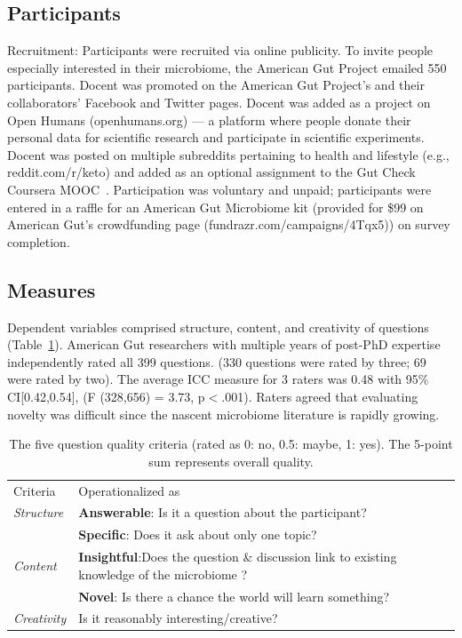 \subsection*{Participants}
Recruitment: Participants were recruited via online publicity. To invite people especially interested in their microbiome, the American Gut Project emailed 550 participants. Docent was promoted on the American Gut Project’s and their collaborators’ Facebook and Twitter pages. Docent was added as a project on Open Humans (openhumans.org) — a platform where people donate their personal data for scientific research and participate in scientific experiments. Docent was posted on multiple subreddits pertaining to health and lifestyle (e.g., reddit.com/r/keto) and added as an optional assignment to the Gut Check Coursera MOOC~\cite{Knight2016}. Participation was voluntary and unpaid; participants were entered in a raffle for an American Gut Microbiome kit (provided for \$99 on American Gut’s crowdfunding page (fundrazr.com/campaigns/4Tqx5)) on survey completion.

\subsection*{Measures}
Dependent variables comprised structure, content, and creativity of questions (Table~\ref{d-tab:rubric1}). American Gut researchers with multiple years of post-PhD expertise independently rated all 399 questions. (330 questions were rated by three; 69 were rated by two). The average ICC measure for 3 raters was 0.48 with 95\% CI[0.42,0.54], (F (328,656) = 3.73, p$<$.001). Raters agreed that evaluating novelty was difficult since the nascent microbiome literature is rapidly growing.

\vspace{0.25in}
\begin{table}[!ht]
\caption[The five question quality criteria]
{The five question quality criteria (rated as 0: no, 0.5:
maybe, 1: yes). The 5-point sum represents overall quality.}

\vspace{-0.25in}
\begin{center}
\renewcommand{\arraystretch}{1.5} %
\begin{tabular}{p{1in}p{4.5in}}
\hline
Criteria & Operationalized as \\
\textit{Structure} 	& \textbf{Answerable}: Is it a question about the participant? \\
 				& \textbf{Specific}: Does it ask about only one topic? \\

\textit{Content} 	& \textbf{Insightful}:Does the question \& discussion link to existing knowledge of the microbiome ? \\
				& \textbf{Novel}: Is there a chance the world will learn something? \\

\textit{Creativity} 	& Is it reasonably interesting/creative? \\
\hline
\end{tabular}
\end{center}
\label{d-tab:rubric1}
\end{table}

